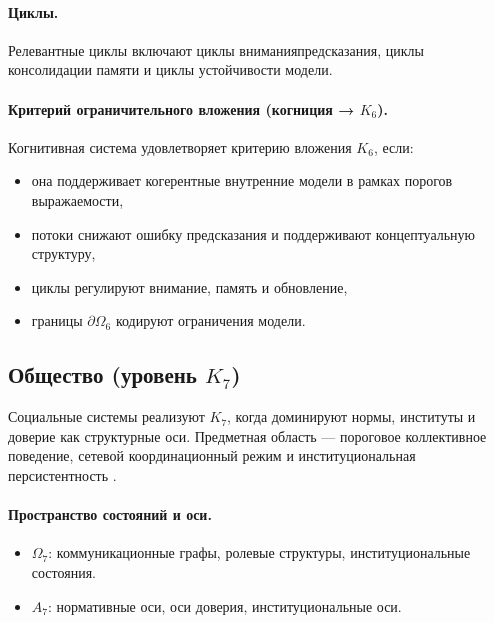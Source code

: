 \paragraph{Циклы.}
Релевантные циклы включают циклы внимания\textendash предсказания,
циклы консолидации памяти и циклы устойчивости модели.

\paragraph{Критерий ограничительного вложения (когниция →
            \texorpdfstring{$K_6$}{K6}).}
Когнитивная система удовлетворяет критерию вложения \(K_6\), если:
\begin{itemize}
  \item она поддерживает когерентные внутренние модели в рамках порогов
        выражаемости,
  \item потоки снижают ошибку предсказания и поддерживают концептуальную
        структуру,
  \item циклы регулируют внимание, память и обновление,
  \item границы \(\partial\Omega_6\) кодируют ограничения модели.
\end{itemize}

\subsection{Общество (уровень \texorpdfstring{$K_7$}{K7})}

Социальные системы реализуют \(K_7\), когда доминируют нормы, институты
и доверие как структурные оси.
Предметная область — пороговое коллективное поведение, сетевой
координационный режим и институциональная персистентность
\parencite{granovetter_threshold,schelling_micromotives,newman_networks}.

\paragraph{Пространство состояний и оси.}
\begin{itemize}
  \item \(\Omega_7\): коммуникационные графы, ролевые структуры,
        институциональные состояния.
  \item \(A_7\): нормативные оси, оси доверия, институциональные оси.
\end{itemize}

